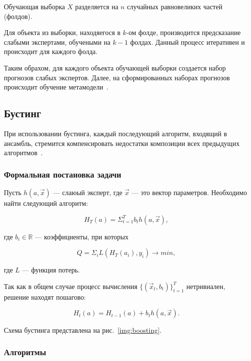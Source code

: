 Обучающая выборка $X$ разделяется на $n$ случайных равновеликих частей (фолдов).

Для объекта из выборки, находяегося в $k$-ом фолде, производится предсказание слабыми экспертами, обучеными на $k-1$ фолдах. Данный процесс итеративен и происходит для каждого фолда.

Таким обрахом, для каждого объекта обучающей выборки создается набор прогнозов слабых экспертов. Далее, на сформированных наборах прогнозов происходит обучение метамодели~\cite{ensembles}.

\subsection{Бустинг}

При использовании бустинга, каждый последующий алгоритм, входящий в ансамбль, стремится компенсировать недостатки композиции всех предыдущих алгоритмов~\cite{ensembles}.

\subsubsection*{Формальная постановка задачи}

Пусть $h(a, \overrightarrow{x})$ --- слаюый эксперт, где $\overrightarrow{x}$ --- это вектор параметров. Необходимо найти следующий алгоритм:

\begin{equation}
H_T(a) = \Sigma_{t=1}^T b_th(a, \overrightarrow{x}),
\end{equation}

где $b_i \in \mathbb{R}$ --- коэффициенты, при которых

\begin{equation}
Q = \Sigma_iL(H_T(a_i), y_i) \to min,
\end{equation}

где $L$ --- функция потерь. 

Так как в общем случае процесс вычисления $\{(\overrightarrow{x}_t, b_t)\}_{t=1}^T$ нетривиален, решение находят пошагово:

\begin{equation}
H_t(a) = H_{t-1}(a) + b_th(a, \overrightarrow{x}).
\end{equation}

Схема бустинга представлена на рис.~\ref{img:boosting}.


\subsubsection*{Алгоритмы}

